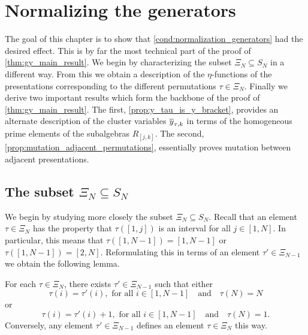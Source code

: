 \section{Normalizing the generators}\label{sec:normalizing_generators}

The goal of this chapter is to show that \cref{cond:normalization_generators} had the desired effect. This is by far the most technical part of the proof of \cref{thm:gy_main_result}. We begin by characterizing the subset $\Xi_N \subseteq S_N$ in a different way. From this we obtain a description of the $\eta$-functions of the presentations corresponding to the different permutations $\tau \in \Xi_N$. Finally we derive two important results which form the backbone of the proof of \cref{thm:gy_main_result}. The first, \cref{prop:y_tau_is_y_bracket}, provides an alternate description of the cluster variables $\overline{y}_{\tau, k}$ in terms of the homogeneous prime elements of the subalgebras $R_{[j, k]}$. The second, \cref{prop:mutation_adjacent_permutations}, essentially proves mutation between adjacent presentations. 

\subsection{The subset $\Xi_N \subseteq S_N$}

We begin by studying more closely the subset $\Xi_N \subseteq S_N$. Recall that an
element $\tau \in \Xi_N$ has the property that $\tau([1, j])$ is an interval for all $j
	\in [1, N]$. In particular, this means that $\tau([1, N-1]) = [1, N-1]$ or $\tau([1,
		N-1]) = [2, N]$. Reformulating this in terms of an element $\tau' \in \Xi_{N-1}$ we
obtain the following lemma.
\begin{lemma}
	For each $\tau \in \Xi_N$, there exists $\tau' \in \Xi_{N-1}$ such that either
	\begin{equation*}
		\tau(i) = \tau'(i), \text{ for all } i \in [1, N-1] \quad \text{and} \quad \tau(N) = N
	\end{equation*}
	or
	\begin{equation*}
		\tau(i) = \tau'(i) + 1, \text{ for all } i \in [1, N-1] \quad \text{and} \quad \tau(N) = 1.
	\end{equation*}
	Conversely, any element $\tau' \in \Xi_{N-1}$ defines an element $\tau \in \Xi_N$ this
	way.
\end{lemma}

